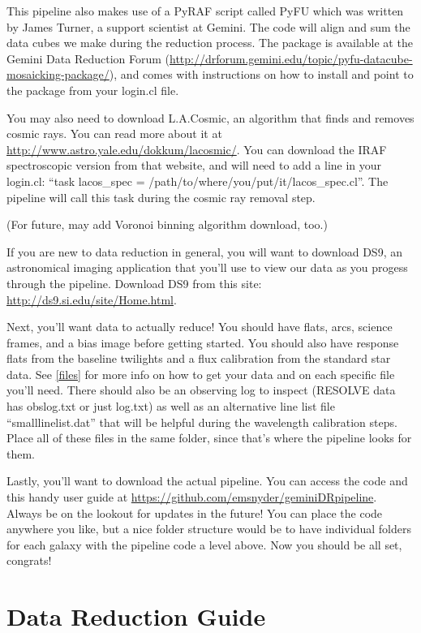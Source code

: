 \documentclass[12pt]{report}
\begin{document}
This pipeline also makes use of a PyRAF script called PyFU which was written by James Turner, a support scientist at Gemini. The code will align and sum the data cubes we make during the reduction process. The package is available at the Gemini Data Reduction Forum (\url{http://drforum.gemini.edu/topic/pyfu-datacube-mosaicking-package/}), and comes with instructions on how to install and point to the package from your login.cl file.

You may also need to download L.A.Cosmic, an algorithm that finds and removes cosmic rays. You can read more about it at \url{http://www.astro.yale.edu/dokkum/lacosmic/}. You can download the IRAF spectroscopic version from that website, and will need to add a line in your login.cl: ``task lacos\_spec = /path/to/where/you/put/it/lacos\_spec.cl''. The pipeline will call this task during the cosmic ray removal step.

(For future, may add Voronoi binning algorithm download, too.)

If you are new to data reduction in general, you will want to download DS9, an astronomical imaging application that you'll use to view our data as you progess through the pipeline. Download DS9 from this site: \url{http://ds9.si.edu/site/Home.html}.

Next, you'll want data to actually reduce! You should have flats, arcs, science frames, and a bias image before getting started. You should also have response flats from the baseline twilights and a flux calibration from the standard star data. See \autoref{files} for more info on how to get your data and on each specific file you'll need. There should also be an observing log to inspect (RESOLVE data has obslog.txt or just log.txt) as well as an alternative line list file ``smalllinelist.dat'' that will be helpful during the wavelength calibration steps. Place all of these files in the same folder, since that's where the pipeline looks for them. 

Lastly, you'll want to download the actual pipeline. You can access the code and this handy user guide at \url{https://github.com/emsnyder/geminiDRpipeline}. Always be on the lookout for updates in the future! You can place the code anywhere you like, but a nice folder structure would be to have individual folders for each galaxy with the pipeline code a level above. Now you should be all set, congrats!

\chapter{Data Reduction Guide}
\end{document}
